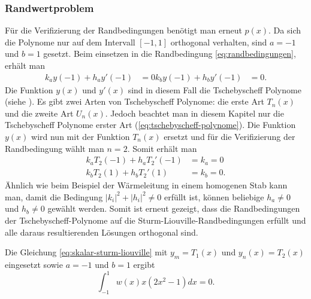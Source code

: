 \subsubsection*{Randwertproblem}
Für die Verifizierung der Randbedingungen benötigt man erneut $p(x)$.
Da sich die Polynome nur auf dem Intervall $[ -1,1 ]$ orthogonal verhalten, sind $a = -1$ und $b = 1$ gesetzt.
Beim einsetzen in die Randbedingung \ref{eq:randbedingungen}, erhält man
\begin{equation}
\begin{aligned}
	k_a y(-1) + h_a y'(-1) &= 0
	k_b y(-1) + h_b y'(-1) &= 0.
\end{aligned} 
\end{equation}
Die Funktion $y(x)$ und $y'(x)$ sind in diesem Fall die Tschebyscheff Polynome (siehe \label{sub:definiton_der_tschebyscheff-Polynome}).
Es gibt zwei Arten von Tschebyscheff Polynome: die erste Art $T_n(x)$ und die zweite Art $U_n(x)$.
Jedoch beachtet man in diesem Kapitel nur die Tschebyscheff Polynome erster Art (\ref{eq:tschebyscheff-polynome}).
Die Funktion $y(x)$ wird nun mit der Funktion $T_n(x)$ ersetzt und für die Verifizierung der Randbedingung wählt man $n=2$.
Somit erhält man
\begin{equation}
	\begin{aligned}
	k_a T_2(-1) + h_a T_{2}'(-1) &= k_a = 0\\
	k_b T_2(1) + h_b T_{2}'(1) &= k_b = 0.
\end{aligned}
\end{equation}
Ähnlich wie beim Beispiel der Wärmeleitung in einem homogenen Stab kann man, damit die Bedingung $|k_i|^2 + |h_i|^2\ne 0$ erfüllt ist, können beliebige $h_a \ne 0$ und $h_b \ne 0$ gewählt werden.
Somit ist erneut gezeigt, dass die Randbedingungen der Tschebyscheff-Polynome auf die Sturm-Liouville-Randbedingungen erfüllt und alle daraus resultierenden Lösungen orthogonal sind.

\begin{beispiel}
	Die Gleichung \ref{eq:skalar-sturm-liouville} mit $y_m = T_1(x)$ und $y_n(x) = T_2(x)$ eingesetzt sowie $a=-1$ und $b = 1$ ergibt
	\[
	\int_{-1}^{1} w(x) x (2x^2-1) dx = 0.
	\]
\end{beispiel}

 










